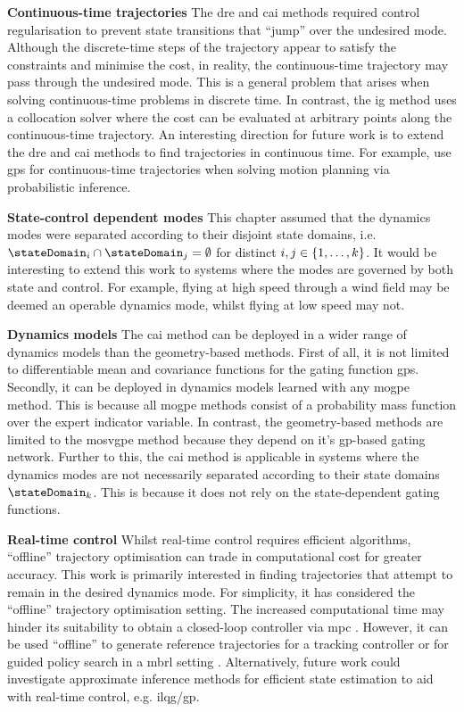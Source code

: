 \documentclass{mimosis-class/mimosis}
\numberwithin{equation}{chapter}
\newcommand{\modeInd}{\ensuremath{k}}
\newcommand{\ModeInd}{\ensuremath{\MakeUppercase{\modeInd}}}
\newcommand{\mode}[1]{\ensuremath{#1_{\modeInd}}}
\begin{document}
{\textbf{Continuous-time trajectories}
The \acrshort{dre} and \acrshort{cai} methods required control regularisation to prevent state transitions that
``jump'' over the undesired mode.
Although the discrete-time steps of the trajectory appear to satisfy the constraints and minimise the cost,
in reality, the continuous-time trajectory may pass through the undesired mode.
This is a general problem that arises when solving continuous-time problems in discrete time.
In contrast, the \acrshort{ig} method uses a collocation solver where the cost can be evaluated at arbitrary
points along the continuous-time trajectory.
An interesting direction for future work is to extend the \acrshort{dre} and \acrshort{cai} methods
to find trajectories in continuous time.
For example, \cite{mukadamContinuoustime2018,dongMotion2016}  use \acrshort{gps} for continuous-time trajectories
when solving motion planning via probabilistic inference.

\textbf{State-control dependent modes}
This chapter assumed that the dynamics modes were separated according to their disjoint
state domains, i.e.
\(\stateDomain_{i} \cap \stateDomain_{j} = \emptyset\) for distinct \(i, j \in \{1, \ldots, \ModeInd\}\).
It would be interesting to extend this work to systems where the modes are governed by both state and control.
For example, flying at high speed through a wind field may be deemed an operable dynamics mode, whilst
flying at low speed may not.

\textbf{Dynamics models}
The \acrshort{cai} method can be deployed in a wider range of dynamics models than the geometry-based
methods.
First of all, it is not limited to differentiable mean and covariance functions for the gating function \acrshort{gps}.
Secondly, it can be deployed in dynamics models learned with any \acrshort{mogpe} method.
This is because all \acrshort{mogpe} methods consist of a probability mass function over the expert indicator
variable.
In contrast, the geometry-based methods are limited to the \acrshort{mosvgpe} method because they depend on
it's \acrshort{gp}-based gating network.
Further to this, the \acrshort{cai} method is applicable in systems where the dynamics modes are not
necessarily separated according to their state domains \(\mode{\stateDomain}\).
This is because it does not rely on the state-dependent gating functions.

\textbf{Real-time control}
Whilst real-time control requires efficient algorithms,
``offline'' trajectory optimisation can trade in computational cost for greater accuracy.
This work is primarily interested in finding trajectories that attempt to remain in the
desired dynamics mode.
For simplicity, it has considered the ``offline'' trajectory optimisation setting.
The increased computational time may hinder
its suitability to obtain a closed-loop controller via \acrshort{mpc} \citep{eduardof.Model2007}.
However, it can be used ``offline'' to generate reference trajectories for a tracking controller
or for guided policy search in a \acrshort{mbrl} setting \citep{levineGuided2013}.
Alternatively, future work could investigate approximate inference methods for efficient state estimation
to aid with real-time control, e.g. \acrshort{ilqg}/\acrshort{gp}.

}
\end{document}
